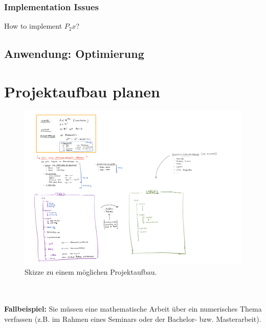 \subsubsection{Implementation Issues}
How to implement $P_2 x$?

\newpage
\subsection{Anwendung: Optimierung}
\clearpage
\section{Projektaufbau planen}
\begin{figure}[h!]
	\centering
	\includegraphics[width=1.3
	\linewidth]{./media//ProjectMindMap2}
	\caption[Mindmap zum Projektaufbau]{Skizze zu einem möglichen Projektaufbau.}
	\label{fig:projektaufbau}
\end{figure}
~\\~\\
\textbf{Fallbeispiel:} Sie müssen eine mathematische Arbeit über ein numerisches Thema verfassen (z.B. im Rahmen eines Seminars oder der Bachelor- bzw. Masterarbeit).

